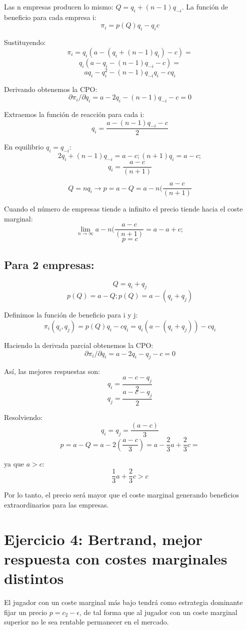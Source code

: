\documentclass{article}
\begin{document}
Las n empresas producen lo mismo: $Q=q_i+(n-1)q_{-i}$.
                                                                                                                                                                                              La funci\'on de beneficio para cada empresa i:            
$$\pi_i=p(Q)q_i-q_ic$$

Sustituyendo:
$$\pi_i=q_i(a-(q_i+(n-1)q_i)-c)=$$
$$q_i(a-q_i-(n-1)q_{-i}-c)=$$
$$aq_i-q_i^2-(n-1)q_{-i}q_i-cq_i$$

Derivando obtenemos la CPO:
$$\partial \pi_i/\partial q_i= a-2q_i-(n-1)q_{-i}-c=0$$

Extraemos la funci\'on de reacci\'on para cada i:
$$q_i=\frac{a-(n-1)q_{-i}-c}{2}$$

En equilibrio $q_i=q_{-i}$:
$$2q_i+(n-1)q_{-i}=a-c; (n+1)q_i=a-c;$$
$$q_i=\frac{a-c}{(n+1)}$$

$$Q=nq_i \rightarrow p=a-Q=a-n(\frac{a-c}{(n+1)}$$

Cuando el n\'umero de empresas tiende a infinito el precio tiende hacia el coste marginal:
$$\lim_{n\rightarrow \infty}a-n(\frac{a-c}{(n+1)}=a-a+c;$$
$$p=c$$

\subsection{Para 2 empresas:}

$$Q=q_i+q_j$$
$$p(Q)=a-Q; p(Q)=a-(q_i+q_j)$$

Definimos la funci\'on de beneficio para i y j:
$$\pi_i(q_i,q_j)=p(Q)q_i-cq_i=q_i(a-(q_i+q_j))-cq_i$$

Haciendo la derivada parcial obtenemos la CPO:
$$\partial \pi_i/\partial q_i= a-2q_i-q_j-c=0$$

As\'i, las mejores respuestas son:
$$q_i=\frac{a-c-q_j}{2}$$
$$q_j=\frac{a-c-q_j}{2}$$

Resolviendo:
$$q_i=q_j=\frac{(a-c)}{3}$$
$$p=a-Q=a-2(\frac{a-c}{3})=a-\frac{2}{3}a+\frac{2}{3}c=$$

ya que $a>c$:
$$\frac{1}{3}a+\frac{2}{3}c>c$$

Por lo tanto, el precio ser\'a mayor que el coste marginal generando beneficios extraordinarios para las empresas.

\section{Ejercicio 4: Bertrand, mejor respuesta con costes marginales distintos}

El jugador con un coste marginal m\'as bajo tendr\'a como estrategia dominante fijar un precio $p=c_2-\epsilon$, de tal forma que al jugador con un coste marginal superior no le sea rentable permanecer en el mercado.
\end{document}
